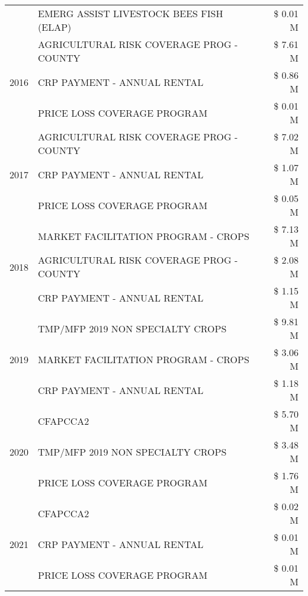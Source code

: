 \begin{tabular}{llr}
 & EMERG ASSIST LIVESTOCK BEES FISH (ELAP) & \$ 0.01 M \\
\cline{1-3}
\multirow[t]{3}{*}{2016} & AGRICULTURAL RISK COVERAGE PROG - COUNTY      & \$ 7.61 M \\
 & CRP PAYMENT - ANNUAL RENTAL                   & \$ 0.86 M \\
 & PRICE LOSS COVERAGE PROGRAM                   & \$ 0.01 M \\
\cline{1-3}
\multirow[t]{3}{*}{2017} & AGRICULTURAL RISK COVERAGE PROG - COUNTY & \$ 7.02 M \\
 & CRP PAYMENT - ANNUAL RENTAL & \$ 1.07 M \\
 & PRICE LOSS COVERAGE PROGRAM & \$ 0.05 M \\
\cline{1-3}
\multirow[t]{3}{*}{2018} & MARKET FACILITATION PROGRAM - CROPS & \$ 7.13 M \\
 & AGRICULTURAL RISK COVERAGE PROG - COUNTY & \$ 2.08 M \\
 & CRP PAYMENT - ANNUAL RENTAL & \$ 1.15 M \\
\cline{1-3}
\multirow[t]{3}{*}{2019} & TMP/MFP 2019 NON SPECIALTY CROPS & \$ 9.81 M \\
 & MARKET FACILITATION PROGRAM - CROPS & \$ 3.06 M \\
 & CRP PAYMENT - ANNUAL RENTAL & \$ 1.18 M \\
\cline{1-3}
\multirow[t]{3}{*}{2020} & CFAPCCA2 & \$ 5.70 M \\
 & TMP/MFP 2019 NON SPECIALTY CROPS & \$ 3.48 M \\
 & PRICE LOSS COVERAGE PROGRAM & \$ 1.76 M \\
\cline{1-3}
\multirow[t]{3}{*}{2021} & CFAPCCA2 & \$ 0.02 M \\
 & CRP PAYMENT - ANNUAL RENTAL & \$ 0.01 M \\
 & PRICE LOSS COVERAGE PROGRAM & \$ 0.01 M \\
\cline{1-3}
\bottomrule
\end{tabular}

